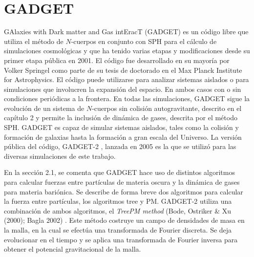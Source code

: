 \documentclass[a4paper,openright,12pt]{book}
\begin{document}
\chapter{GADGET}\label{GADGET}
GAlaxies with Dark matter and Gas intEracT (GADGET) es un código libre que utiliza el método de $N$-cuerpos en conjunto con SPH para el cálculo de simulaciones cosmológicas y que ha tenido varias etapas y modificaciones desde su primer etapa pública en 2001. El código fue desarrollado en su mayoría por Volker Springel \cite{b4} como parte de su tesis de doctorado en el Max Planck Institute for Astrophysics. El código puede utilizarse para analizar sistemas aislados o para simulaciones que involucren la expansión del espacio. En ambos casos con o sin condiciones periódicas a la frontera. En todas las simulaciones, GADGET sigue la evolución de un sistema de $N$-cuerpos sin colisión autogravitante, descrito en el capítulo 2 y permite la inclusión de dinámica de gases, descrita por el método SPH.
GADGET es capaz de simular sistemas aislados, tales como la colisión y formación de galaxias hasta la formación a gran escala del Universo. La versión pública del código, GADGET-2 \cite{b10}, lanzada en 2005 es la que se utilizó para las diversas simulaciones de este trabajo.

En la sección 2.1, se comenta que GADGET hace uso de distintos algoritmos para calcular fuerzas entre partículas de materia oscura y la dinámica de gases para materia bariónica. Se describe de forma breve dos algoritmos para calcular la fuerza entre partículas, los algoritmos tree y PM. GADGET-2 utiliza una combinación de ambos algoritmos, el \textit{TreePM method} (Bode, Ostriker \& Xu (2000); Bagla 2002) \cite{3.0.1, 3.0.2}. Este método costruye un campo de densidades de masa en la malla, en la cual se efectúa una transformada de Fourier discreta. Se deja evolucionar en el tiempo y se aplica una transformada de Fourier inversa para obtener el potencial gravitacional de la malla.
\end{document}
